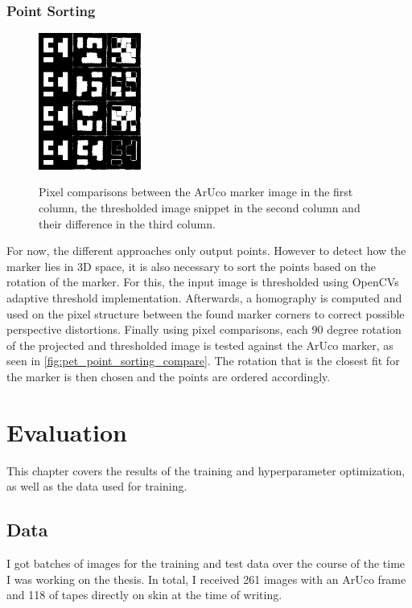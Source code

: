 \documentclass[10pt]{book}
\newcommand{\figureref}[1]{\autoref{#1}}
\begin{document}
\subsection{Point Sorting}

\begin{figure}
  \caption{Pixel comparisons between the \ac{ArUco} marker image in the first column, the thresholded image snippet in the second column and their difference in the third column.}
  \includegraphics[width=0.3\textwidth]{image/pet_point_sorting_compare}
  \label{fig:pet_point_sorting_compare}
\end{figure}

For now, the different approaches only output points. However to detect how the marker lies in 3D space, it is also necessary to sort the points based on the rotation of the marker. For this, the input image is thresholded using \acp{OpenCV} adaptive threshold implementation. Afterwards, a homography is computed and used on the pixel structure between the found marker corners to correct possible perspective distortions. Finally using pixel comparisons, each 90 degree rotation of the projected and thresholded image is tested against the \ac{ArUco} marker, as seen in \figureref{fig:pet_point_sorting_compare}. The rotation that is the closest fit for the marker is then chosen and the points are ordered accordingly.

\chapter{Evaluation}
\label{chap:eval}

This chapter covers the results of the training and hyperparameter optimization, as well as the data used for training.

\section{Data}

I got batches of images for the training and test data over the course of the time I was working on the thesis. In total, I received 261 images with an \ac{ArUco} frame and 118 of tapes directly on skin at the time of writing. 
\end{document}
